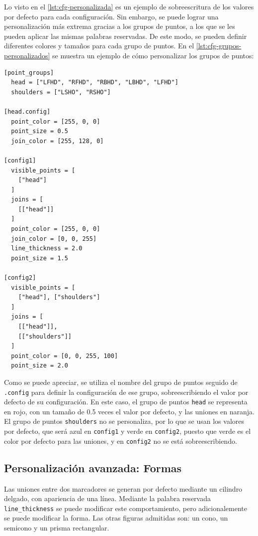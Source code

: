 Lo visto en el \autoref{lst:cfg-personalizada} es un ejemplo de sobreescritura de los valores por defecto para cada configuración. Sin embargo, se puede lograr una personalización más extrema gracias a los grupos de puntos, a los que se les pueden aplicar las mismas palabras reservadas. De este modo, se pueden definir diferentes colores y tamaños para cada grupo de puntos. En el \autoref{lst:cfg-grupos-personalizados} se muestra un ejemplo de cómo personalizar los grupos de puntos:

\begin{lstlisting}[style=mystyle, caption={Configuración personalizada de grupos de puntos}, label={lst:cfg-grupos-personalizados}]
[point_groups]
  head = ["LFHD", "RFHD", "RBHD", "LBHD", "LFHD"]
  shoulders = ["LSHO", "RSHO"]

[head.config]
  point_color = [255, 0, 0]
  point_size = 0.5
  join_color = [255, 128, 0]

[config1]
  visible_points = [
    ["head"]
  ]
  joins = [
    [["head"]]
  ]
  point_color = [255, 0, 0]
  join_color = [0, 0, 255]
  line_thickness = 2.0
  point_size = 1.5

[config2]
  visible_points = [
    ["head"], ["shoulders"]
  ]
  joins = [
    [["head"]], 
    [["shoulders"]]
  ]
  point_color = [0, 0, 255, 100]
  point_size = 2.0
\end{lstlisting}

Como se puede apreciar, se utiliza el nombre del grupo de puntos seguido de \texttt{.config} para definir la configuración de ese grupo, sobreescribiendo el valor por defecto de su configuración. En este caso, el grupo de puntos \texttt{head} se representa en rojo, con un tamaño de 0.5 veces el valor por defecto, y las uniones en naranja. El grupo de puntos \texttt{shoulders} no se personaliza, por lo que se usan los valores por defecto, que será azul en \texttt{config1} y verde en \texttt{config2}, puesto que verde es el color por defecto para las uniones, y en \texttt{config2} no se está sobreescribiendo.

\subsection{Personalización avanzada: Formas}

Las uniones entre dos marcadores se generan por defecto mediante un cilindro delgado, con apariencia de una línea. Mediante la palabra reservada \texttt{line\_thickness} se puede modificar este comportamiento, pero adicionalemente se puede modificar la forma. Las otras figuras admitidas son: un cono, un semicono y un prisma rectangular.

